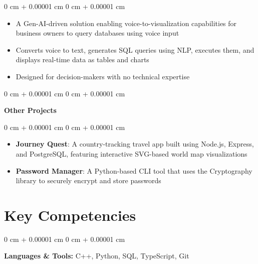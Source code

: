 \documentclass[10pt, letterpaper]{article}
\newenvironment{highlights}{
    \begin{itemize}[
        topsep=0.10 cm,
        parsep=0.10 cm,
        partopsep=0pt,
        itemsep=0pt,
        leftmargin=0 cm + 10pt
    ]
}{
    \end{itemize}
} %
\newenvironment{onecolentry}{
    \begin{adjustwidth}{
        0 cm + 0.00001 cm
    }{
        0 cm + 0.00001 cm
    }
}{
    \end{adjustwidth}
} %
\newenvironment{twocolentry}[2][]{
    \onecolentry
    \def\secondColumn{#2}
    \setcolumnwidth{\fill, 4.5 cm}
    \begin{paracol}{2}
}{
    \switchcolumn \raggedleft \secondColumn
    \end{paracol}
    \endonecolentry
} %
\begin{document}
        \vspace{0.10 cm}
        \begin{onecolentry}
            \begin{highlights}
                \item A Gen-AI-driven solution enabling voice-to-visualization capabilities for business owners to query databases using voice input
                \item Converts voice to text, generates SQL queries using NLP, executes them, and displays real-time data as tables and charts
                \item Designed for decision-makers with no technical expertise
            \end{highlights}
        \end{onecolentry}

        \vspace{0.2 cm}

        \begin{twocolentry}{
            \href{https://github.com/ritheshan}{\faGithub}
        }
            \textbf{Other Projects}\end{twocolentry}

        \vspace{0.10 cm}
        \begin{onecolentry}
            \begin{highlights}
                \item \textbf{Journey Quest}: A country-tracking travel app built using Node.js, Express, and PostgreSQL, featuring interactive SVG-based world map visualizations
                \item \textbf{Password Manager}: A Python-based CLI tool that uses the Cryptography library to securely encrypt and store passwords
            \end{highlights}
        \end{onecolentry}

    \section{Key Competencies}

        \begin{onecolentry}
            \textbf{Languages \& Tools:} C++, Python, SQL, TypeScript, Git
        \end{onecolentry}

        \vspace{0.2 cm}
\end{document}
